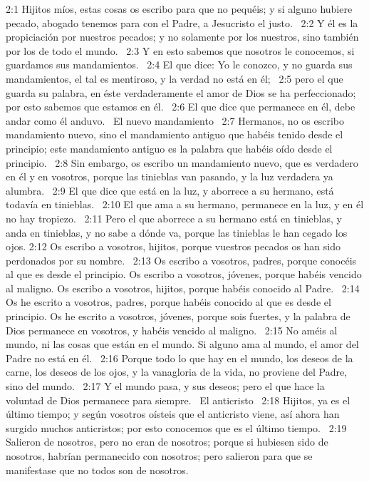 2:1 Hijitos míos, estas cosas os escribo para que no pequéis; y si alguno hubiere pecado, abogado tenemos para con el Padre, a Jesucristo el justo.  
2:2 Y él es la propiciación por nuestros pecados; y no solamente por los nuestros, sino también por los de todo el mundo.  
2:3 Y en esto sabemos que nosotros le conocemos, si guardamos sus mandamientos.  
2:4 El que dice: Yo le conozco, y no guarda sus mandamientos, el tal es mentiroso, y la verdad no está en él;  
2:5 pero el que guarda su palabra, en éste verdaderamente el amor de Dios se ha perfeccionado; por esto sabemos que estamos en él.  
2:6 El que dice que permanece en él, debe andar como él anduvo.  
El nuevo mandamiento  
2:7 Hermanos, no os escribo mandamiento nuevo, sino el mandamiento antiguo que habéis tenido desde el principio; este mandamiento antiguo es la palabra que habéis oído desde el principio.  
2:8 Sin embargo, os escribo un mandamiento nuevo, que es verdadero en él y en vosotros, porque las tinieblas van pasando, y la luz verdadera ya alumbra.  
2:9 El que dice que está en la luz, y aborrece a su hermano, está todavía en tinieblas.  
2:10 El que ama a su hermano, permanece en la luz, y en él no hay tropiezo.  
2:11 Pero el que aborrece a su hermano está en tinieblas, y anda en tinieblas, y no sabe a dónde va, porque las tinieblas le han cegado los ojos. 
2:12 Os escribo a vosotros, hijitos, porque vuestros pecados os han sido perdonados por su nombre.  
2:13 Os escribo a vosotros, padres, porque conocéis al que es desde el principio. Os escribo a vosotros, jóvenes, porque habéis vencido al maligno. Os escribo a vosotros, hijitos, porque habéis conocido al Padre.  
2:14 Os he escrito a vosotros, padres, porque habéis conocido al que es desde el principio. Os he escrito a vosotros, jóvenes, porque sois fuertes, y la palabra de Dios permanece en vosotros, y habéis vencido al maligno.  
2:15 No améis al mundo, ni las cosas que están en el mundo. Si alguno ama al mundo, el amor del Padre no está en él.  
2:16 Porque todo lo que hay en el mundo, los deseos de la carne, los deseos de los ojos, y la vanagloria de la vida, no proviene del Padre, sino del mundo.  
2:17 Y el mundo pasa, y sus deseos; pero el que hace la voluntad de Dios permanece para siempre.  
El anticristo  
2:18 Hijitos, ya es el último tiempo; y según vosotros oísteis que el anticristo viene, así ahora han surgido muchos anticristos; por esto conocemos que es el último tiempo.  
2:19 Salieron de nosotros, pero no eran de nosotros; porque si hubiesen sido de nosotros, habrían permanecido con nosotros; pero salieron para que se manifestase que no todos son de nosotros.  
